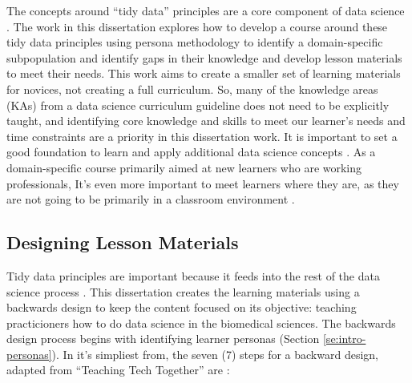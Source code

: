 \documentclass[010-intro.tex]{subfiles}
\begin{document}
    The concepts around ``tidy data'' principles are a core component of data science
    \cite{ccdsc2021, wickhamTidyData2014}.
    The work in this dissertation explores how to develop a course around these tidy data principles
    using persona methodology to identify a domain-specific subpopulation and identify gaps in their knowledge
    and develop lesson materials to meet their needs.
    This work aims to create a smaller set of learning materials for novices, not creating a full curriculum.
    So, many of the knowledge areas (KAs) from a data science curriculum guideline does not need to be explicitly taught,
    and identifying core knowledge and skills to meet our learner's needs and time constraints are a priority
    in this dissertation work.
    It is important to set a good foundation to learn and apply additional data science concepts
    \cite{cc2005, cc2020, gaise2016, ambrose2010learning, wilson2019teaching, hermansProgrammerBrain2021}.
    As a domain-specific course primarily aimed at new learners who are working professionals,
    It's even more important to meet learners where they are, as they are not going to be primarily in a classroom environment
    \cite{wilson2019teaching, Koch2016, thecarpentriesCarpentryTrainerTraining}.

    \subsection{Designing Lesson Materials}

        Tidy data principles are important because it feeds into the rest of the data science process
        \cite{wickhamTidyData2014, ccdsc2021, wickhamR4ds}.
        This dissertation creates the learning materials using a backwards design to keep the content focused
        on its objective: teaching practicioners how to do data science in the biomedical sciences.
        The backwards design process begins with identifying learner personas (Section \ref{se:intro-personas}).
        In it's simpliest from, the seven (7) steps for a backward design, adapted from ``Teaching Tech Together'' are
        \cite{wilson2019teaching}:
\end{document}
